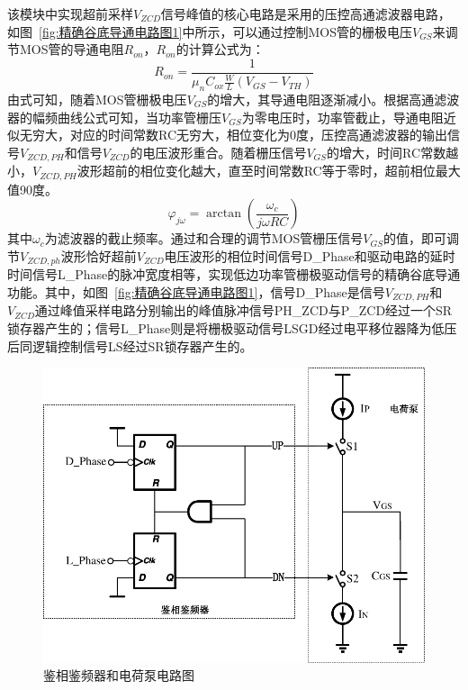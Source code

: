 该模块中实现超前采样$V_{ZCD}$信号峰值的核心电路是采用的压控高通滤波器电路，如图~\ref{fig:精确谷底导通电路图1}中所示，可以通过控制MOS管的栅极电压$V_{GS}$来调节MOS管的导通电阻$R_{on}$，$R_{on}$的计算公式为：
\begin{equation}
    \label{eq:Ron公式}
    R_{on}=\frac{1}{\mu_n C_{ox} \frac{W}{L} (V_{GS} - V_{TH})}
\end{equation}
由式可知，随着MOS管栅极电压$V_{GS}$的增大，其导通电阻逐渐减小。根据高通滤波器的幅频曲线公式可知，当功率管栅压$V_{GS}$为零电压时，功率管截止，导通电阻近似无穷大，对应的时间常数RC无穷大，相位变化为0度，压控高通滤波器的输出信号$V_{ZCD,PH}$和信号$V_{ZCD}$的电压波形重合。随着栅压信号$V_{GS}$的增大，时间RC常数越小，$V_{ZCD,PH}$波形超前的相位变化越大，直至时间常数RC等于零时，超前相位最大值90度。
\begin{equation}
    \label{eq:jw公式}
    \varphi_{j\omega }=\arctan (\frac{\omega_c}{j\omega R C })
\end{equation}
其中$\omega_c$为滤波器的截止频率。通过和合理的调节MOS管栅压信号$V_{GS}$的值，即可调节$V_{ZCD,ph}$波形恰好超前$V_{ZCD}$电压波形的相位时间信号D\_Phase和驱动电路的延时时间信号L\_Phase的脉冲宽度相等，实现低边功率管栅极驱动信号的精确谷底导通功能。其中，如图~\ref{fig:精确谷底导通电路图1}，信号D\_Phase是信号$V_{ZCD,PH}$和$V_{ZCD}$通过峰值采样电路分别输出的峰值脉冲信号PH\_ZCD与P\_ZCD经过一个SR锁存器产生的；信号L\_Phase则是将栅极驱动信号LSGD经过电平移位器降为低压后同逻辑控制信号LS经过SR锁存器产生的。

\begin{figure}[htbp] 
    \centering
    \includegraphics[width=0.8\linewidth]{figures/鉴相鉴频器.pdf}
    \caption{鉴相鉴频器和电荷泵电路图}
    \label{fig:鉴相鉴频器电路图}
\end{figure}

